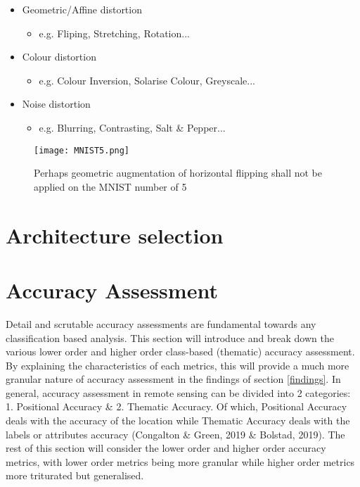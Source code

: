 \documentclass[11pt, a4paper, twoside]{report}
\begin{document}
\begin{itemize}
  \item Geometric/Affine distortion
    \begin{itemize}
      \item e.g. Fliping, Stretching, Rotation...
    \end{itemize}
\end{itemize}
\begin{itemize}
  \item Colour distortion
    \begin{itemize}
      \item e.g. Colour Inversion, Solarise Colour, Greyscale...
    \end{itemize}
\end{itemize}
\begin{itemize}
  \item Noise distortion
    \begin{itemize}
      \item e.g. Blurring, Contrasting, Salt \& Pepper...
    \end{itemize}
\end{itemize}


\begin{figure}[h]
  \centering
  \texttt{[image: MNIST5.png]}
  \caption{Perhaps geometric augmentation of horizontal flipping shall not be applied on the MNIST number of 5}
  \label{fig:MNIST5}
\end{figure}


\section{Architecture selection}\label{Archi}
\section{Accuracy Assessment}\label{AccAss}

Detail and scrutable accuracy assessments are fundamental towards any classification based analysis. This section will introduce and break down the various lower order and higher order class-based (thematic) accuracy assessment. By explaining the characteristics of each metrics, this will provide a much more granular nature of accuracy assessment in the findings of section \ref{findings}. In general, accuracy assessment in remote sensing can be divided into 2 categories: 1. Positional Accuracy \& 2. Thematic Accuracy. Of which, Positional Accuracy deals with the accuracy of the location while Thematic Accuracy deals with the labels or attributes accuracy (Congalton \& Green, 2019 \& Bolstad, 2019). The rest of this section will consider the lower order and higher order accuracy metrics, with lower order metrics being more granular while higher order metrics more triturated but generalised.\\\par
\end{document}
